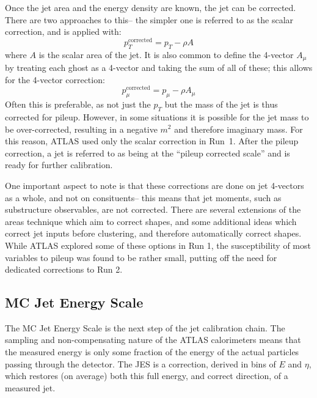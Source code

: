 
Once the jet area and the energy density are known, the jet can be corrected. There are two approaches to this-- the simpler one is referred to as the scalar correction, and is applied with:
%
\begin{equation}
p_T^{\mathrm{corrected}} = p_T - \rho A
\end{equation}
%
where $A$ is the scalar area of the jet. It is also common to define the 4-vector $A_\mu$ by treating each ghost as a 4-vector and taking the sum of all of these; this allows for the 4-vector correction:
%
\begin{equation}
p_\mu^{\mathrm{corrected}} = p_\mu - \rho A_\mu
\end{equation}
%
Often this is preferable, as not just the $p_T$ but the mass of the jet is thus corrected for pileup. However, in some situations it is possible for the jet mass to be over-corrected, resulting in a negative $m^2$ and therefore imaginary mass. For this reason, ATLAS used only the scalar correction in Run~1. After the pileup correction, a jet is referred to as being at the ``pileup corrected scale'' and is ready for further calibration.

One important aspect to note is that these corrections are done on jet 4-vectors as a whole, and not on consituents-- this means that jet moments, such as substructure observables, are not corrected. There are several extensions of the areas technique which aim to correct shapes, and some additional ideas which correct jet inputs before clustering, and therefore automatically correct shapes. While ATLAS explored some of these options in Run 1, the susceptibility of most variables to pileup was found to be rather small, putting off the need for dedicated corrections to Run 2. 



\subsection{MC Jet Energy Scale}

The MC Jet Energy Scale is the next step of the jet calibration chain. The sampling and non-compensating nature of the ATLAS calorimeters means that the measured energy is only some fraction of the energy of the actual particles passing through the detector. The JES is a correction, derived in bins of $E$ and $\eta$, which restores (on average) both this full energy, and correct direction, of a measured jet.



